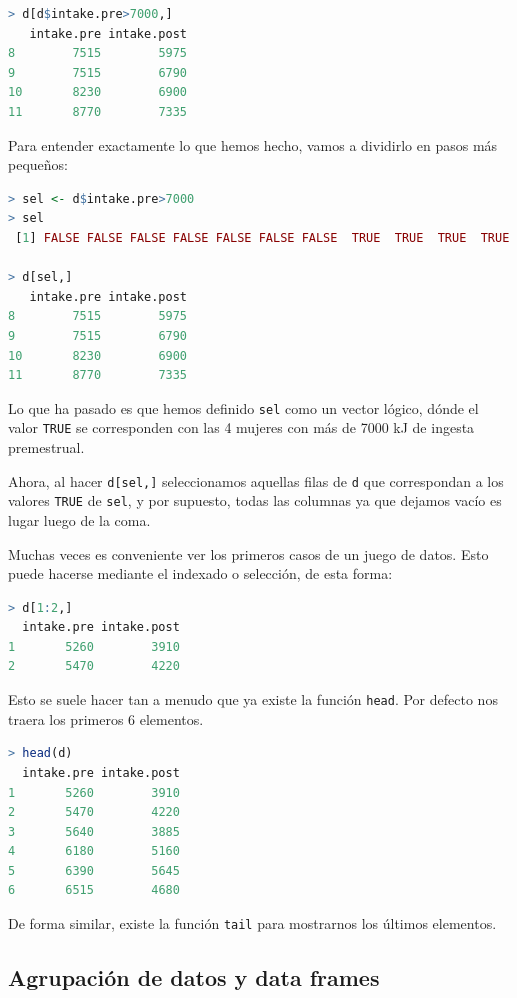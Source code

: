 \documentclass[spanish]{extbook}
\numberwithin{equation}{section}
\numberwithin{figure}{section}
\begin{document}
\begin{lstlisting}[language=R]
> d[d$intake.pre>7000,]
   intake.pre intake.post
8        7515        5975
9        7515        6790
10       8230        6900
11       8770        7335
\end{lstlisting}

Para entender exactamente lo que hemos hecho, vamos a dividirlo en pasos más
pequeños:

\begin{lstlisting}[language=R]
> sel <- d$intake.pre>7000
> sel
 [1] FALSE FALSE FALSE FALSE FALSE FALSE FALSE  TRUE  TRUE  TRUE  TRUE

> d[sel,]
   intake.pre intake.post
8        7515        5975
9        7515        6790
10       8230        6900
11       8770        7335
\end{lstlisting}

Lo que ha pasado es que hemos definido \texttt{sel} como un vector lógico,
dónde el valor \texttt{TRUE} se corresponden con las 4 mujeres con más de 7000
kJ de ingesta premestrual.

Ahora, al hacer \texttt{d[sel,]} seleccionamos aquellas filas de \texttt{d} que
correspondan a los valores \texttt{TRUE} de \texttt{sel}, y por supuesto, todas
las columnas ya que dejamos vacío es lugar luego de la coma.

Muchas veces es conveniente ver los primeros casos de un juego de datos. Esto
puede hacerse mediante el indexado o selección, de esta forma:

\begin{lstlisting}[language=R]
> d[1:2,]
  intake.pre intake.post
1       5260        3910
2       5470        4220
\end{lstlisting}

Esto se suele hacer tan a menudo que ya existe la función \texttt{head}. Por
defecto nos traera los primeros 6 elementos.

\begin{lstlisting}[language=R]
> head(d)
  intake.pre intake.post
1       5260        3910
2       5470        4220
3       5640        3885
4       6180        5160
5       6390        5645
6       6515        4680
\end{lstlisting}

De forma similar, existe la función \texttt{tail} para mostrarnos los últimos
elementos.

\subsection{Agrupación de datos y data frames}
\end{document}
